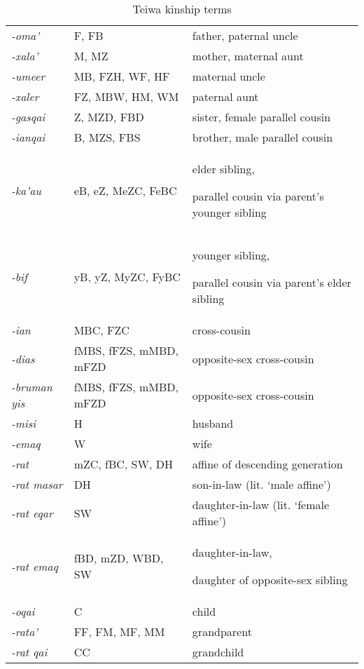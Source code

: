 \begin{table}
\begin{tabular}{p{3cm}p{3cm}p{5cm}}
\textit{{}-oma'} & F, FB & father, paternal uncle\\
\textit{{}-xala'} & M, MZ & mother, maternal aunt\\
\textit{{}-umeer} & MB, FZH, WF, HF & maternal uncle\\
\textit{{}-xaler} & FZ, MBW, HM, WM & paternal aunt\\
\textit{{}-gasqai} & Z, MZD, FBD & sister, female parallel cousin\\
\textit{{}-ianqai} & B, MZS, FBS & brother, male parallel cousin\\
\textit{{}-ka'au} & eB, eZ, MeZC, FeBC & elder sibling,

parallel cousin via parent's younger sibling\\
\textit{{}-bif} & yB, yZ, MyZC, FyBC & younger sibling,

parallel cousin via parent's elder sibling\\
\textit{{}-ian} & MBC, FZC & cross-cousin\\
\textit{{}-dias} & fMBS, fFZS, mMBD, mFZD & opposite-sex cross-cousin\\
\textit{{}-bruman yis} & fMBS, fFZS, mMBD, mFZD & opposite-sex cross-cousin\\
\textit{{}-misi} & H & husband\\
\textit{{}-emaq} & W & wife\\
\textit{{}-rat} & mZC, fBC, SW, DH & affine of descending generation\\
\textit{{}-rat masar} & DH & son-in-law (lit. `male affine')\\
\textit{{}-rat eqar} & SW & daughter-in-law (lit. `female affine')\\
\textit{{}-rat emaq} & fBD, mZD, WBD, SW & daughter-in-law,

daughter of opposite-sex sibling\\
\textit{{}-oqai} & C & child\\
\textit{{}-rata'} & FF, FM, MF, MM & grandparent\\
\textit{{}-rat qai} & CC & grandchild\\
\end{tabular}

\caption{Teiwa kinship terms}
\end{table}

